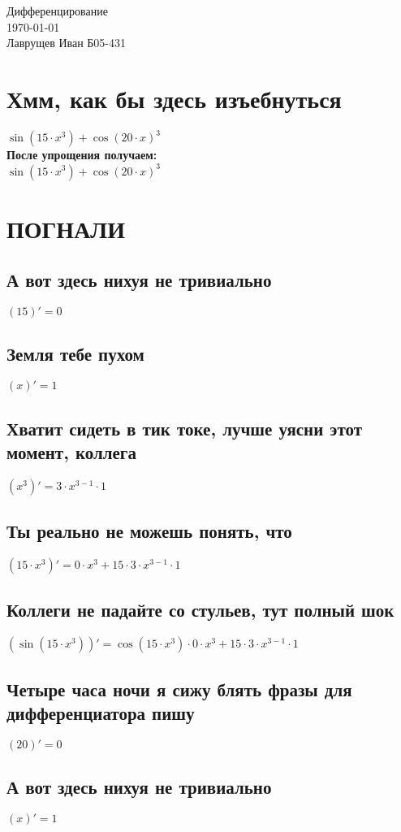 \documentclass[12pt]{article}
\begin{document}
\begingroup
    \centering
    \LARGE Дифференцирование\\
    \large \today \\[0.5em]
    \large Лаврущев Иван Б05-431\par
\endgroup
\tableofcontents
\section{Хмм, как бы здесь изъебнуться}
$\sin(15 \cdot x^{3}) + \cos(20 \cdot x)^{3}$\\
\textbf{После упрощения получаем:}\\
$\sin(15 \cdot x^{3}) + \cos(20 \cdot x)^{3}$\\
\section{ПОГНАЛИ}
\subsection{А вот здесь нихуя не тривиально}
$(15)' = 0$
\subsection{Земля тебе пухом}
$(x)' = 1$
\subsection{Хватит сидеть в тик токе, лучше уясни этот момент, коллега}
$(x^{3})' = 3 \cdot x^{3 - 1} \cdot 1$
\subsection{Ты реально не можешь понять, что}
$(15 \cdot x^{3})' = 0 \cdot x^{3} + 15 \cdot 3 \cdot x^{3 - 1} \cdot 1$
\subsection{Коллеги не падайте со стульев, тут полный шок}
$(\sin(15 \cdot x^{3}))' = \cos(15 \cdot x^{3}) \cdot 0 \cdot x^{3} + 15 \cdot 3 \cdot x^{3 - 1} \cdot 1$
\subsection{Четыре часа ночи я сижу блять фразы для дифференциатора пишу}
$(20)' = 0$
\subsection{А вот здесь нихуя не тривиально}
$(x)' = 1$
\end{document}
